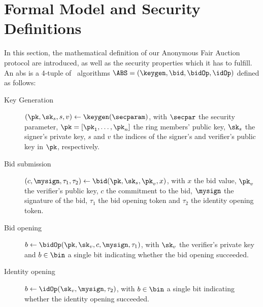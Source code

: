 \section{Formal Model and Security Definitions}
\label{sec-formal}
In this section, the mathematical definition of our Anonymous Fair Auction protocol are introduced, as well as the security properties which it has to fulfill. An \gls{abs} is a 4-tuple of \ppt ~algorithms $\ABS=(\keygen,\bid,\bidOp,\idOp)$ defined as follows:

\begin{description}
	\item[Key Generation]
	$(\pk, \sk_s,s,v)\gets \keygen(\secparam)$, with $\secpar$ the security parameter, $\pk=[\pk_1,\dots,\pk_n]$ the ring members' public key, $\sk_s$ the signer's private key, $s$ and $v$ the indices of the signer's and verifier's public key in $\pk$, respectively.
	\item[Bid submission]
	$(c, \mysign, \tau_1, \tau_2)\gets\bid(\pk, \sk_s, \pk_v, x)$, with $x$ the bid value, $\pk_v$ the verifier's public key, $c$ the commitment to the bid, $\mysign$ the signature of the bid, $\tau_1$ the bid opening token and $\tau_2$ the identity opening token.
	\item[Bid opening]
	$b\gets\bidOp(\pk, \sk_v, c, \mysign, \tau_1)$, with $\sk_v$ the verifier's private key and $b\in\bin$ a single bit indicating whether the bid opening succeeded.
	\item[Identity opening]
	$b\gets\idOp(\sk_v, \mysign, \tau_2)$, with $b\in\bin$ a single bit indicating whether the identity opening succeeded.
\end{description}

